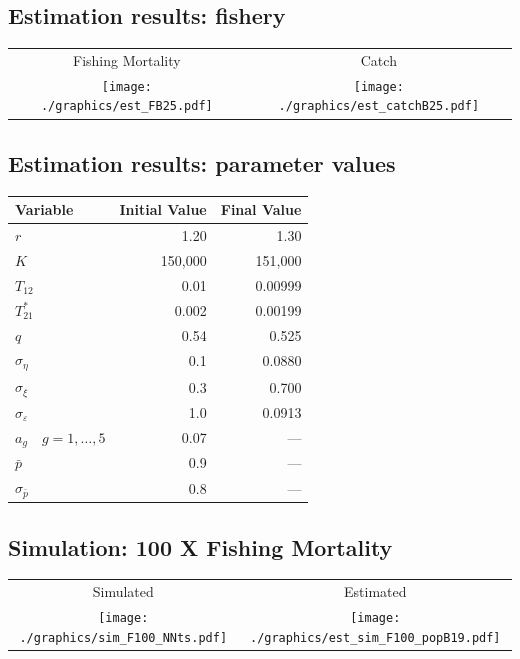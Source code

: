 \documentclass[a4paper,KOMA,landscape,titlepage]{powersem}
\begin{document}
\begin{slide}\section{Estimation results: fishery}
\begin{center}
\begin{tabular}{cc}
{\tiny Fishing Mortality} & {\tiny Catch}\\
\texttt{[image: ./graphics/est\_FB25.pdf]}&
\texttt{[image: ./graphics/est\_catchB25.pdf]}\\
\end{tabular}
\end{center}
\end{slide}

\begin{slide}\section{Estimation results: parameter values}
{%
\begin{center}
\begin{tabular}{lrr}
\hline
Variable & Initial Value & Final Value\\
\hline
\hline
$r$ & 1.20&  1.30\\
$K$ & 150,000 & 151,000 \\
$T_{12}$ & 0.01 & 0.00999\\
$T^*_{21}$& 0.002 & 0.00199\\
$q$ & 0.54 & 0.525\\
\hline
$\sigma_\eta$ & 0.1 & 0.0880\\
$\sigma_\xi$ & 0.3 & 0.700\\
$\sigma_\varepsilon$ & 1.0 & 0.0913\\
$a_g\quad g=1,\dots,5$ & 0.07 & ---\\
\hline
$\bar{p}$ & 0.9 & ---\\
$\sigma_{\bar{p}}$ & 0.8 & ---\\
\hline
\end{tabular}
\end{center}
}
\end{slide}

\begin{slide}\section{Simulation: 100 X Fishing Mortality}
\begin{center}
\begin{tabular}{cc}
Simulated & Estimated\\
\texttt{[image: ./graphics/sim\_F100\_NNts.pdf]}&
\texttt{[image: ./graphics/est\_sim\_F100\_popB19.pdf]}
\end{tabular}
\end{center}
\end{slide}
\end{document}

